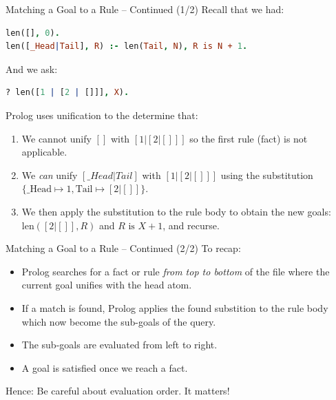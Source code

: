 \begin{frame}[fragile]{Matching a Goal to a Rule -- Continued (1/2)}
Recall that we had: 

\begin{lstlisting}[language=prolog, xleftmargin=0.5cm]
len([], 0).
len([_Head|Tail], R) :- len(Tail, N), R is N + 1.
\end{lstlisting}

\pause

And we ask: 

\begin{lstlisting}[language=prolog, xleftmargin=0.5cm]
? len([1 | [2 | []]], X).
\end{lstlisting}

\pause

Prolog uses unification to the determine that:

\begin{enumerate}
    \item We cannot unify $[]$ with $[1 | [2 | []]]$ so the first rule (fact) is
    not applicable. \pause 
    \item We \emph{can} unify $[\_Head|Tail]$ with $[1 | [2 | []]]$ using the
    substitution $\{ \text{\_Head} \mapsto 1, \text{Tail} \mapsto [2 | []] \}$. \pause
    \item We then apply the substitution to the rule body to obtain the new
    goals: $\text{len}([2 | []], R)$ and $R \text{ is } X + 1$, and recurse.
\end{enumerate}
\end{frame}

\begin{frame}[fragile]{Matching a Goal to a Rule -- Continued (2/2)}
To recap:

\begin{itemize}
    \item Prolog searches for a fact or rule \emph{from top to bottom} of the
    file where the current goal unifies with the head atom.
    \item If a match is found, Prolog applies the found substition to the rule
    body which now become the sub-goals of the query. 
    \item The sub-goals are evaluated from left to right.
    \item A goal is satisfied once we reach a fact.
\end{itemize}

Hence: Be careful about evaluation order. It matters!
\end{frame}

